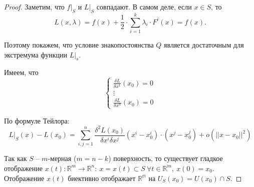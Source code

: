 \documentclass{report}
\theoremstyle{definition}
\begin{document}
\begin{proof}
  Заметим, что $f\big|_S$ и $L\big|_S$ совпадают. В самом деле, если $x\in S$, то
  \begin{equation*}
    L(x,\lambda) = f(x) + \frac{1}{2}\cdot\sum_{i=1}^{k}\lambda_i\cdot F^i(x) = f(x).
  \end{equation*}

  Поэтому покажем, что условие знакопостоянства $Q$ является достаточным для экстремума функции $L\big|_s$.

  Имеем, что
  \begin{equation*}
    \left\{\begin{array}{l}
      \frac{\delta L}{\delta x^1}(x_0) = 0 \\
      \vdots                               \\
      \frac{\delta L}{\delta x^n}(x_0) = 0
    \end{array}\right.
  \end{equation*}

  По формуле Тейлора:
  \begin{equation}
    L\big|_S(x) - L(x_0) = \sum_{i,j=1}^{n}\frac{\delta^2 L(x_0)}{\delta x^i \delta x^j}(x^i - x_0^i)\cdot (x^j - x_0^j) + o(||x-x_0||^2)
  \end{equation}

  Так как $S$ -- $m$-мерная ($m=n-k$) поверхность, то существует гладкое отображение $x(t):\mathbb{R}^m\rightarrow\mathbb{R}^n: \ x = x(t) \subset S \ \forall t \in \mathbb{R}^m, \ x(0) = x_0$. Отображение $x(t)$ биективно отображает $\mathbb{R^m}$ на $U_S(x_0) = U(x_0)\cap S$.


\end{proof}
\end{document}
